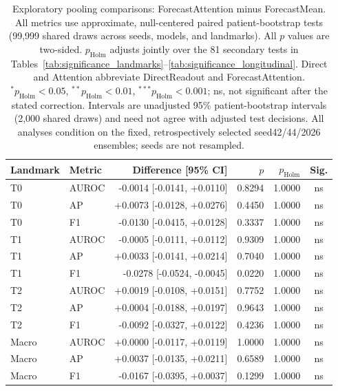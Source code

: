 \begin{table}[t]
\centering
\small
\caption{Exploratory pooling comparisons: ForecastAttention minus ForecastMean. All metrics use approximate, null-centered paired patient-bootstrap tests (99,999 shared draws across seeds, models, and landmarks). All $p$ values are two-sided. $p_{\mathrm{Holm}}$ adjusts jointly over the 81 secondary tests in Tables~\ref{tab:significance_landmarks}--\ref{tab:significance_longitudinal}. Direct and Attention abbreviate DirectReadout and ForecastAttention. $^{*}p_{\mathrm{Holm}}<0.05$, $^{**}p_{\mathrm{Holm}}<0.01$, $^{***}p_{\mathrm{Holm}}<0.001$; ns, not significant after the stated correction. Intervals are unadjusted 95\% patient-bootstrap intervals (2,000 shared draws) and need not agree with adjusted test decisions. All analyses condition on the fixed, retrospectively selected seed42/44/2026 ensembles; seeds are not resampled.}
\label{tab:significance_pooling}
\begin{tabular}{llrrrc}
\toprule
Landmark & Metric & Difference [95\% CI] & $p$ & $p_{\mathrm{Holm}}$ & Sig. \\
\midrule
T0 & AUROC & -0.0014 [-0.0141, +0.0110] & 0.8294 & 1.0000 & ns \\
T0 & AP & +0.0073 [-0.0128, +0.0276] & 0.4450 & 1.0000 & ns \\
T0 & F1 & -0.0130 [-0.0415, +0.0128] & 0.3337 & 1.0000 & ns \\
T1 & AUROC & -0.0005 [-0.0111, +0.0112] & 0.9309 & 1.0000 & ns \\
T1 & AP & +0.0033 [-0.0141, +0.0214] & 0.7040 & 1.0000 & ns \\
T1 & F1 & -0.0278 [-0.0524, -0.0045] & 0.0220 & 1.0000 & ns \\
T2 & AUROC & +0.0019 [-0.0108, +0.0151] & 0.7752 & 1.0000 & ns \\
T2 & AP & +0.0004 [-0.0188, +0.0197] & 0.9643 & 1.0000 & ns \\
T2 & F1 & -0.0092 [-0.0327, +0.0122] & 0.4236 & 1.0000 & ns \\
Macro & AUROC & +0.0000 [-0.0117, +0.0119] & 1.0000 & 1.0000 & ns \\
Macro & AP & +0.0037 [-0.0135, +0.0211] & 0.6589 & 1.0000 & ns \\
Macro & F1 & -0.0167 [-0.0395, +0.0037] & 0.1299 & 1.0000 & ns \\
\bottomrule
\end{tabular}
\end{table}
